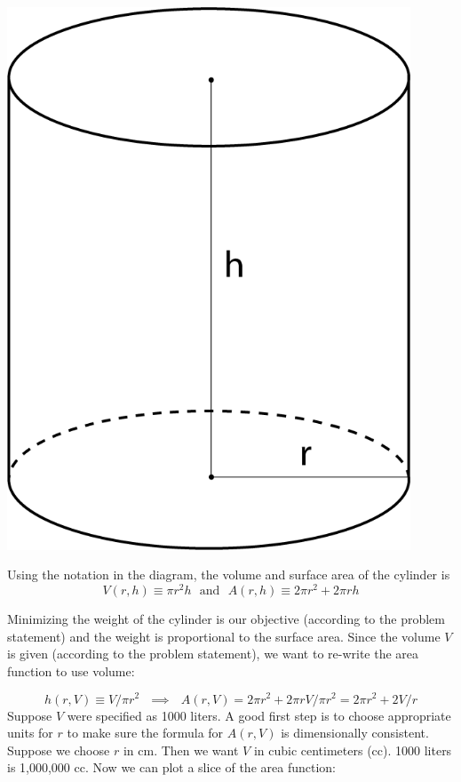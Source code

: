 \documentclass[
  letterpaper,
  DIV=11,
  numbers=noendperiod,
  oneside]{scrreprt}
\begin{document}
\begin{marginfigure}

{\centering \includegraphics[width=0.9\textwidth,height=\textheight]{Differentiation/www/cylinder.png}

}

\end{marginfigure}

Using the notation in the diagram, the volume and surface area of the
cylinder is
\[V(r, h) \equiv \pi r^2 h \ \ \ \text{and}\ \ \ A(r, h) \equiv 2 \pi r^2 + 2 \pi r h\]

Minimizing the weight of the cylinder is our objective (according to the
problem statement) and the weight is proportional to the surface area.
Since the volume \(V\) is given (according to the problem statement), we
want to re-write the area function to use volume:

\[h(r, V) \equiv V / \pi r^2 \ \ \ \implies\ \ \ A(r, V) = 2 \pi r^2 + 2 \pi r V/\pi r^2 = 2 \pi r^2 + 2 V / r\]
Suppose \(V\) were specified as 1000 liters. A good first step is to
choose appropriate units for \(r\) to make sure the formula for
\(A(r, V)\) is dimensionally consistent. Suppose we choose \(r\) in cm.
Then we want \(V\) in cubic centimeters (cc). 1000 liters is 1,000,000
cc. Now we can plot a slice of the area function:
\end{document}
